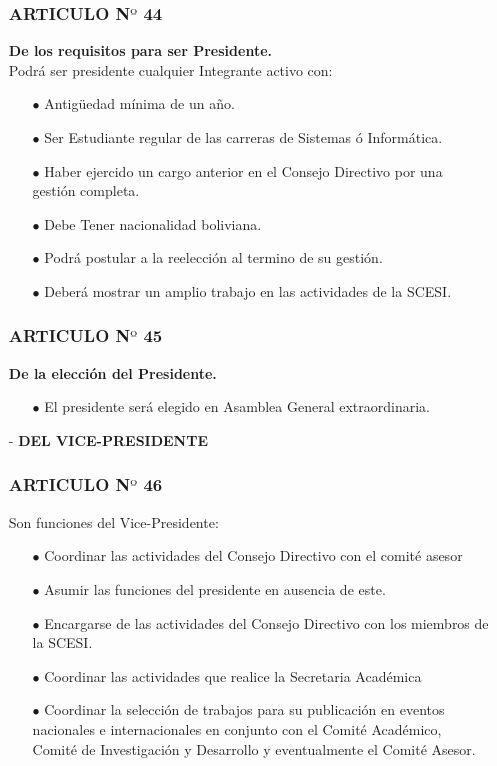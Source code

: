 \documentclass[letterpaper,11pt]{book}
\begin{document}
\begin{itemize}
\subsubsection*{ARTICULO N$º$ 44}
{\bf De los requisitos para ser Presidente.}\\
Podrá ser presidente cualquier Integrante activo con: 
\begin{itemize}
\item[$\bullet$] Antigüedad mínima de un año. 
\item[$\bullet$] Ser Estudiante regular de las carreras de Sistemas ó Informática. 
\item[$\bullet$] Haber ejercido un cargo anterior en el Consejo Directivo por una gestión completa. 
\item[$\bullet$] Debe Tener nacionalidad boliviana.  
\item[$\bullet$] Podrá postular a la reelección al termino de su gestión. 
\item[$\bullet$] Deberá mostrar un amplio trabajo en las actividades de la SCESI.
\end{itemize}
\subsubsection*{ARTICULO N$º$ 45}
{\bf De la elección del Presidente.}
\begin{itemize}
\item[$\bullet$] El presidente será elegido en Asamblea General extraordinaria.
\end{itemize}

\item[-] {\bf DEL VICE-PRESIDENTE}
\subsubsection*{ARTICULO N$º$ 46}
Son funciones del Vice-Presidente:
\begin{itemize}
\item[$\bullet$] Coordinar las actividades del Consejo Directivo con el comité asesor 
\item[$\bullet$] Asumir las funciones del presidente en ausencia de este.  
\item[$\bullet$] Encargarse de las actividades del Consejo Directivo con los miembros de la SCESI. 
\item[$\bullet$] Coordinar las actividades que realice la Secretaria Académica 
\item[$\bullet$] Coordinar la selección de trabajos para su publicación en eventos nacionales e internacionales en conjunto con el Comité Académico, Comité de Investigación y Desarrollo y eventualmente el Comité Asesor. 
\end{itemize}

\end{itemize}
\end{document}
